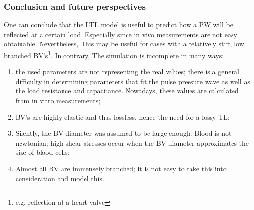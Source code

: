 \subsubsection{Conclusion and future perspectives}
One can conclude that the LTL model is useful to predict how a PW will be reflected at a certain load. Especially since in vivo measurements are not easy obtainable. Nevertheless, This may be useful for cases with a relatively stiff, low branched BV's\footnote{e.g. reflection at a heart valve}. In contrary, The simulation is incomplete in many ways:
\begin{enumerate}
\item the used parameters are not representing the real values; there is a general difficulty in determining parameters that fit the pulse pressure wave as well as the load resistance and capacitance. Nowadays, these values are calculated from in vitro measurements;
\item BV's are highly elastic and thus lossless, hence the need for a lossy TL;
\item Silently, the BV diameter was assumed to be large enough. Blood is not newtonian; high shear stresses occur when the BV diameter approximates the size of blood cells;
\item Almost all BV are immensely branched; it is not easy to take this into consideration and model this.
\end{enumerate}

